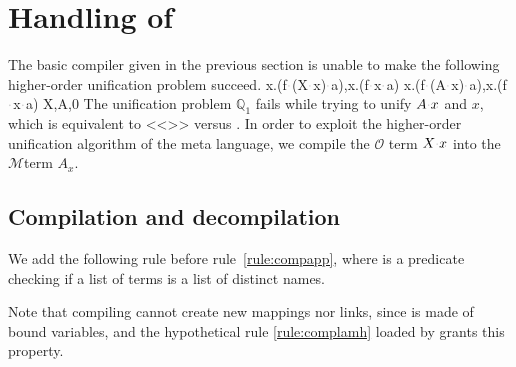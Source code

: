 \documentclass[sigconf,natbib=false,review]{acmart}
\newcommand{\appsep}{\ensuremath{\textcolor{lightgray}{\cdot}}}
\newcommand{\UnifRel}{\ensuremath{\simeq}}
\newcommand{\Uo}{\texorpdfstring{\ensuremath{\UnifRel_o}\xspace}{unif\_o}}
\newcommand{\Fo}{\texorpdfstring{\ensuremath{\mathcal{O}\xspace}}{O}} %
\newcommand{\Ho}{\texorpdfstring{\ensuremath{\mathcal{M}}\xspace}{M}}
\newcommand{\hoUnifPb}{\ensuremath{\mathbb{Q}}\xspace}
\begin{document}
  
\section{Handling of \maybebeta}\label{sec:llam}

The basic compiler given in 
the previous section is unable to make the following
higher-order unification problem succeed.
%
\printAlllSingle
  {{{\lambda x.(f\appsep (X\appsep x)\appsep a),\lambda x.(f\appsep x\appsep a)}}}
  {{{\lambda x.(f\appsep (A\appsep x)\appsep a),\lambda x.(f\appsep x\appsep a)}}}
  {{{X,A,0}}}
  {{}}
The unification problem $\hoUnifPb_1$ fails while trying to unify
$A \appsep x$ and $x$, which is equivalent to <<>>
versus .
In order to exploit the higher-order unification algorithm of the meta language,
we %
compile the \Fo{} term $X\appsep x$ into the \Ho term $A_x$.

\subsection{Compilation and decompilation}

We add the following rule before rule~\ref{rule:compapp}, where
 is a predicate checking if a list of
terms is a list of distinct names.



\noindent
Note that compiling  cannot create new mappings nor links, since 
is made of bound variables, and the hypothetical rule 
\ref{rule:complamh}
loaded by 
grants this property.

\end{document}
